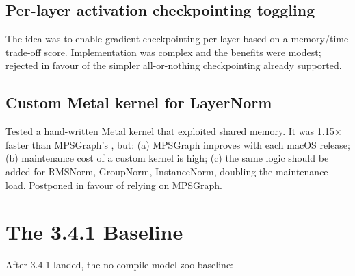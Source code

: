 \subsection{Per-layer activation checkpointing toggling}
\label{ssec:no_compile_sweep:per_layer_ckpt}

The idea was to enable gradient checkpointing per layer based
on a memory/time trade-off score. Implementation was complex
and the benefits were modest; rejected in favour of the
simpler all-or-nothing checkpointing already supported.

\subsection{Custom Metal kernel for LayerNorm}
\label{ssec:no_compile_sweep:custom_metal_ln}

Tested a hand-written Metal kernel that exploited shared
memory. It was 1.15$\times$ faster than MPSGraph's
, but: (a) MPSGraph improves with
each macOS release; (b) maintenance cost of a custom kernel
is high; (c) the same logic should be added for RMSNorm,
GroupNorm, InstanceNorm, doubling the maintenance load.
Postponed in favour of relying on MPSGraph.

\section{The 3.4.1 Baseline}
\label{sec:no_compile_sweep:baseline}

After 3.4.1 landed, the no-compile model-zoo baseline:

